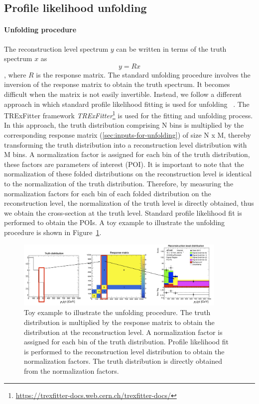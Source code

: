 \subsection{Profile likelihood unfolding}
\label{sec:profile-likelihodd-unfolding}
\paragraph{Unfolding procedure}
The reconstruction level spectrum $y$ can be written in terms of the truth spectrum $x$ as $$ y = R x$$, where $R$ is the response matrix. The standard unfolding procedure involves the inversion of the response matrix to obtain the truth spectrum. It becomes difficult when the matrix is not easily invertible. Instead, we follow a different approach in which standard profile likelihood fitting is used for unfolding ~\cite{cls_3}. The TRExFitter framework \emph{TRExFitter}\footnote{\url{https://trexfitter-docs.web.cern.ch/trexfitter-docs/}} is used for the fitting and unfolding process. In this approach, the truth distribution comprising N bins is multiplied by the corresponding response matrix (\ref{sec:inputs-for-unfolding}) of size N x M, thereby transforming the truth distribution into a reconstruction level distribution with M bins. A normalization factor is assigned for each bin of the truth distribution, these factors are parameters of interest (POI). It is important to note that the normalization of these folded distributions on the reconstruction level is identical to the normalization of the truth distribution. Therefore, by measuring the normalization factors for each bin of each folded distribution on the reconstruction level, the normalization of the truth level is directly obtained, thus we obtain the cross-section at the truth level. Standard profile likelihood fit is performed to obtain the POIs. A toy example to illustrate the unfolding procedure is shown in Figure~\ref{fig:unfolding_toy_example}.

\begin{figure}[ht]
    \centering
    \includegraphics[width=0.9\textwidth]{figures/toy_profile_likelihood_fit.png}
    \caption{Toy example to illustrate the unfolding procedure. The truth distribution is multiplied by the response matrix to obtain the distribution at the reconstruction level. A normalization factor is assigned for each bin of the truth distribution. Profile likelihood fit is performed to the reconstruction level distribution to obtain the normalization factors. The truth distribution is directly obtained from the normalization factors.}

    \label{fig:unfolding_toy_example}
\end{figure}
\FloatBarrier

